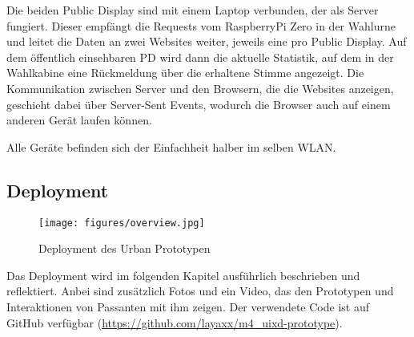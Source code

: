 Die beiden Public Display sind mit einem Laptop verbunden, der als Server fungiert.
Dieser empfängt die Requests vom RaspberryPi Zero in der Wahlurne und leitet die Daten an zwei Websites weiter, jeweils eine pro Public Display.
Auf dem öffentlich einsehbaren PD wird dann die aktuelle Statistik, auf dem in der Wahlkabine eine Rückmeldung über die erhaltene Stimme angezeigt.
Die Kommunikation zwischen Server und den Browsern, die die Websites anzeigen, geschieht dabei über Server-Sent Events, wodurch die Browser auch auf einem anderen Gerät laufen können.

Alle Geräte befinden sich der Einfachheit halber im selben WLAN.

\subsection{Deployment}\label{deployment}

\begin{figure}
    \centering
    \texttt{[image: figures/overview.jpg]}
    \caption{Deployment des Urban Prototypen}
    \label{fig:deployment}
\end{figure}

Das Deployment wird im folgenden Kapitel ausführlich beschrieben und reflektiert.
Anbei sind zusätzlich Fotos und ein Video, das den Prototypen und Interaktionen von Passanten mit ihm zeigen.
Der verwendete Code ist auf GitHub verfügbar (\url{https://github.com/layaxx/m4_uixd-prototype}).